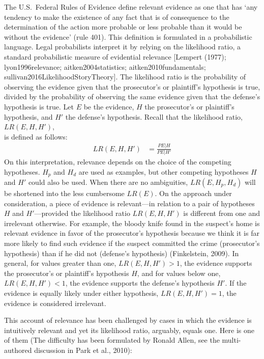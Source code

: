 \documentclass[
  10pt,
  dvipsnames,enabledeprecatedfontcommands]{scrartcl}
\begin{document}
The U.S.~Federal Rules of Evidence define relevant evidence as one that
has `any tendency to make the existence of any fact that is of
consequence to the determination of the action more probable or less
probable than it would be without the evidence' (rule 401). This
definition is formulated in a probabilistic language. Legal probabilists
interpret it by relying on the likelihood ratio, a standard
probabilistic measure of evidential relevance {[}Lempert (1977);
lyon1996relevance; aitken2004statistics; aitken2010fundamentals;
sullivan2016LikelihoodStoryTheory{]}. The likelihood ratio is the
probability of observing the evidence given that the prosecutor's or
plaintiff's hypothesis is true, divided by the probability of observing
the same evidence given that the defense's hypothesis is true. Let \(E\)
be the evidence, \(H\) the prosecutor's or plaintiff's hypothesis, and
\(H'\) the defense's hypothesis. Recall that the likelihood ratio,
\(LR(E, H, H')\),\\
is defined as follows:
\begin{align*}LR(E,H,H') & = \frac{P{E\vert H}}{P{E\vert H'}}
\end{align*} On this interpretation, relevance depends on the choice of
the competing hypotheses. \(H_p\) and \(H_d\) are used as examples, but
other competing hypotheses \(H\) and \(H'\) could also be used. When
there are no ambiguities, \(LR(E, H_p, H_d)\) will be shortened into the
less cumbersome \(LR(E)\). On the approach under consideration, a piece
of evidence is relevant---in relation to a pair of hypotheses \(H\) and
\(H'\)---provided the likelihood ratio \(LR(E, H, H')\) is different
from one and irrelevant otherwise. For example, the bloody knife found
in the suspect's home is relevant evidence in favor of the prosecutor's
hypothesis because we think it is far more likely to find such evidence
if the suspect committed the crime (prosecutor's hypothesis) than if he
did not (defense's hypothesis) (Finkelstein, 2009). In general, for
values greater than one, \(LR(E, H, H')>1\), the evidence supports the
prosecutor's or plaintiff's hypothesis \(H\), and for values below one,
\(LR(E, H, H')<1\), the evidence supports the defense's hypothesis
\(H'\). If the evidence is equally likely under either hypothesis,
\(LR(E, H, H')=1\), the evidence is considered irrelevant.

This account of relevance has been challenged by cases in which the
evidence is intuitively relevant and yet its likelihood ratio, arguably,
equals one. Here is one of them (The difficulty has been formulated by
Ronald Allen, see the multi-authored discussion in Park et al., 2010):
\end{document}

